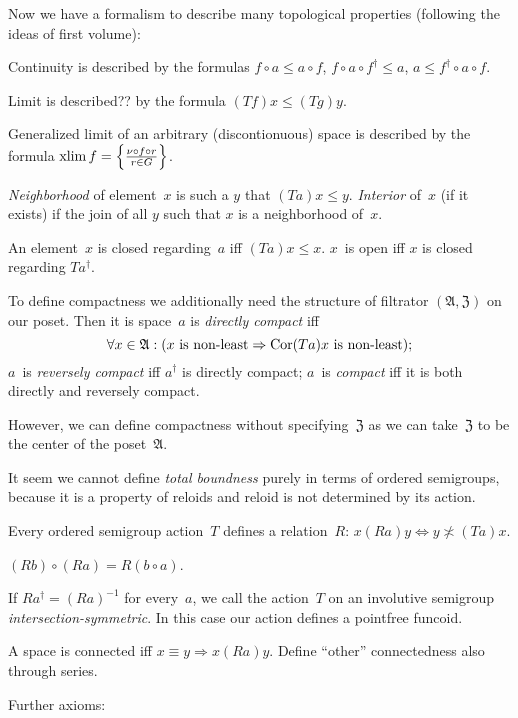 Now we have a formalism to describe many topological properties (following the ideas of first volume):

Continuity is described by the formulas $f\circ a\leq a\circ f$, $f\circ a\circ f^{\dagger}\leq a$, $a\leq f^{\dagger}\circ a\circ f$.

Limit is described?? by the formula $(Tf)x\leq(Tg)y$.

Generalized limit of an arbitrary (discontionuous) space is described by the formula $\operatorname{xlim} f=\left\{ \frac{\nu\circ f\circ r}{r\in G}\right\}$.

\emph{Neighborhood} of element~$x$ is such a $y$ that $(Ta)x\leq y$. \emph{Interior} of~$x$ (if it exists) if the join of all $y$ such that $x$ is a neighborhood of~$x$.

An element~$x$ is closed regarding~$a$ iff $(Ta)x\leq x$. $x$~is open iff $x$ is closed regarding $Ta^{\dagger}$.

To define compactness we additionally need the structure of filtrator $(\mathfrak{A},\mathfrak{Z})$ on our poset. Then it is space~$a$ is \emph{directly compact} iff
\[\forall x\in\mathfrak{A}:(x\text{ is non-least}\Rightarrow\operatorname{Cor}(Ta)x\text{ is non-least}); \]
$a$~is \emph{reversely compact} iff $a^{\dagger}$ is directly compact; $a$~is \emph{compact} iff it is both directly and reversely compact.

However, we can define compactness without specifying~$\mathfrak{Z}$ as we can take~$\mathfrak{Z}$ to be the center of the poset~$\mathfrak{A}$. 

It seem we cannot define \emph{total boundness} purely in terms of ordered semigroups, because it is a property of reloids and reloid is not determined by its action.

Every ordered semigroup action~$T$ defines a relation~$R$: $x(Ra)y\Leftrightarrow y\nasymp(Ta)x$.

\begin{thm}
$(Rb)\circ(Ra) = R(b\circ a)$. 
\end{thm}

If $Ra^{\dagger}=(Ra)^{-1}$ for every~$a$, we call the action~$T$ on an involutive semigroup \emph{inter\-sec\-tion-sym\-met\-ric}. In this case our action defines a pointfree funcoid.

A space is connected iff $x\equiv y\Rightarrow x(Ra)y$. Define ``other'' connectedness also through series.

Further axioms:


